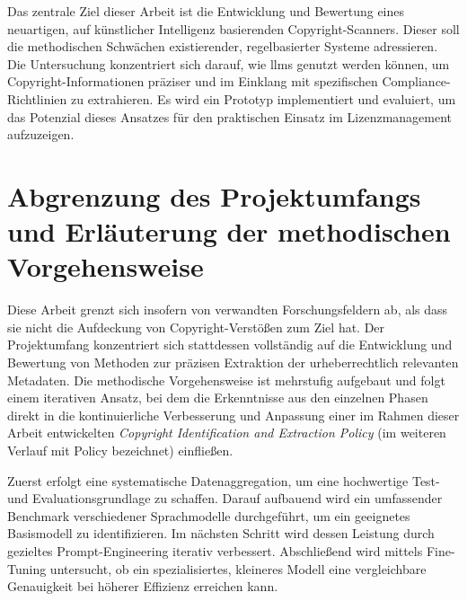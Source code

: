 Das zentrale Ziel dieser Arbeit ist die Entwicklung und Bewertung eines neuartigen, auf künstlicher Intelligenz basierenden Copyright-Scanners.
Dieser soll die methodischen Schwächen existierender, regelbasierter Systeme adressieren.
Die Untersuchung konzentriert sich darauf, wie \glspl{llm} genutzt werden können, um Copyright-Informationen präziser und im Einklang mit spezifischen Compliance-Richtlinien zu extrahieren.
Es wird ein Prototyp implementiert und evaluiert, um das Potenzial dieses Ansatzes für den praktischen Einsatz im Lizenzmanagement aufzuzeigen.


\section{Abgrenzung des Projektumfangs und Erläuterung der methodischen Vorgehensweise}\label{sec:abgrenzung}

Diese Arbeit grenzt sich insofern von verwandten Forschungsfeldern ab, als dass sie nicht die Aufdeckung von Copyright-Verstößen zum Ziel hat.
Der Projektumfang konzentriert sich stattdessen vollständig auf die Entwicklung und Bewertung von Methoden zur präzisen Extraktion der urheberrechtlich relevanten Metadaten.
Die methodische Vorgehensweise ist mehrstufig aufgebaut und folgt einem iterativen Ansatz, bei dem die Erkenntnisse aus den einzelnen Phasen direkt in die kontinuierliche Verbesserung und Anpassung einer im Rahmen dieser Arbeit entwickelten \textit{Copyright Identification and Extraction Policy} (im weiteren Verlauf mit Policy bezeichnet) einfließen.

Zuerst erfolgt eine systematische Datenaggregation, um eine hochwertige Test- und Evaluationsgrundlage zu schaffen.
Darauf aufbauend wird ein umfassender Benchmark verschiedener Sprachmodelle durchgeführt, um ein geeignetes Basismodell zu identifizieren.
Im nächsten Schritt wird dessen Leistung durch gezieltes Prompt-Engineering iterativ verbessert.
Abschließend wird mittels Fine-Tuning untersucht, ob ein spezialisiertes, kleineres Modell eine vergleichbare Genauigkeit bei höherer Effizienz erreichen kann.
